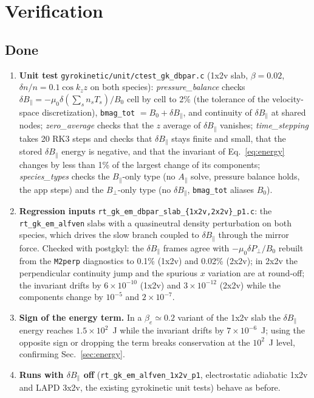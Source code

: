 \documentclass[11pt, letterpaper]{article}
\newcommand{\dBpar}{\delta B_\parallel}
\newcommand{\Apar}{A_\parallel}
\newcommand{\code}[1]{\texttt{#1}}
\begin{document}
\section{Verification}
\label{sec:verif}
\subsection{Done}
\begin{enumerate}
  \item \textbf{Unit test} \code{gyrokinetic/unit/ctest\_gk\_dbpar.c} (1x2v slab, $\beta=0.02$,
  $\delta n/n = 0.1\cos k_zz$ on both species):
  \emph{pressure\_balance} checks $\dBpar = -\mu_0\delta(\sum_s n_sT_s)/B_0$ cell by cell to 2\%
  (the tolerance of the velocity-space discretization), \code{bmag\_tot} $=B_0+\dBpar$, and
  continuity of $\dBpar$ at shared nodes; \emph{zero\_average} checks that the $z$ average of
  $\dBpar$ vanishes; \emph{time\_stepping} takes 20 RK3 steps and checks that $\dBpar$ stays
  finite and small, that the stored $\dBpar$ energy is negative, and that the invariant of
  Eq.~\eqref{eq:energy} changes by less than 1\% of the largest change of its components;
  \emph{species\_types} checks the $B_\parallel$-only type (no $\Apar$ solve, pressure balance
  holds, the app steps) and the $B_\perp$-only type (no $\dBpar$, \code{bmag\_tot} aliases
  $B_0$).
  \item \textbf{Regression inputs} \code{rt\_gk\_em\_dbpar\_slab\_\{1x2v,2x2v\}\_p1.c}: the
  \code{rt\_gk\_em\_alfven} slabs with a quasineutral density perturbation on both species, which
  drives the slow branch coupled to $\dBpar$ through the mirror force. Checked with postgkyl: the
  $\dBpar$ frames agree with $-\mu_0\delta P_\perp/B_0$ rebuilt from the \code{M2perp}
  diagnostics to 0.1\% (1x2v) and 0.02\% (2x2v); in 2x2v the perpendicular continuity jump and
  the spurious $x$ variation are at round-off; the invariant drifts by $6\times10^{-10}$ (1x2v)
  and $3\times10^{-12}$ (2x2v) while the components change by $10^{-5}$ and $2\times10^{-7}$.
  \item \textbf{Sign of the energy term.} In a $\beta_e\simeq0.2$ variant of the 1x2v slab the
  $\dBpar$ energy reaches $1.5\times10^2$~J while the invariant drifts by $7\times10^{-6}$~J;
  using the opposite sign or dropping the term breaks conservation at the $10^2$~J level,
  confirming Sec.~\ref{sec:energy}.
  \item \textbf{Runs with $\dBpar$ off} (\code{rt\_gk\_em\_alfven\_1x2v\_p1}, electrostatic
  adiabatic 1x2v and LAPD 3x2v, the existing gyrokinetic unit tests) behave as before.
\end{enumerate}
\end{document}
